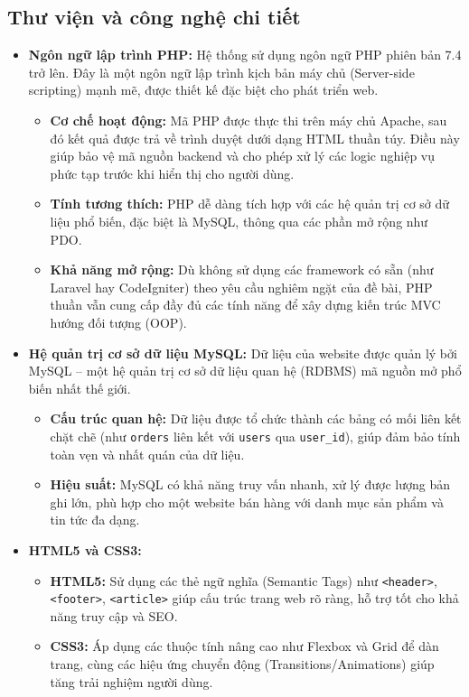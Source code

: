 \subsection{Thư viện và công nghệ chi tiết}
\begin{itemize}
\item \textbf{Ngôn ngữ lập trình PHP: }
Hệ thống sử dụng ngôn ngữ PHP phiên bản 7.4 trở lên. Đây là một ngôn ngữ lập trình kịch bản máy chủ (Server-side scripting) mạnh mẽ, được thiết kế đặc biệt cho phát triển web. 
\begin{itemize}
    \item \textbf{Cơ chế hoạt động:} Mã PHP được thực thi trên máy chủ Apache, sau đó kết quả được trả về trình duyệt dưới dạng HTML thuần túy. Điều này giúp bảo vệ mã nguồn backend và cho phép xử lý các logic nghiệp vụ phức tạp trước khi hiển thị cho người dùng.
    \item \textbf{Tính tương thích:} PHP dễ dàng tích hợp với các hệ quản trị cơ sở dữ liệu phổ biến, đặc biệt là MySQL, thông qua các phần mở rộng như PDO.
    \item \textbf{Khả năng mở rộng:} Dù không sử dụng các framework có sẵn (như Laravel hay CodeIgniter) theo yêu cầu nghiêm ngặt của đề bài, PHP thuần vẫn cung cấp đầy đủ các tính năng để xây dựng kiến trúc MVC hướng đối tượng (OOP).
\end{itemize}
\item \textbf{Hệ quản trị cơ sở dữ liệu MySQL: }
Dữ liệu của website được quản lý bởi MySQL – một hệ quản trị cơ sở dữ liệu quan hệ (RDBMS) mã nguồn mở phổ biến nhất thế giới.
\begin{itemize}
    \item \textbf{Cấu trúc quan hệ:} Dữ liệu được tổ chức thành các bảng có mối liên kết chặt chẽ (như \texttt{orders} liên kết với \texttt{users} qua \texttt{user\_id}), giúp đảm bảo tính toàn vẹn và nhất quán của dữ liệu.
    \item \textbf{Hiệu suất:} MySQL có khả năng truy vấn nhanh, xử lý được lượng bản ghi lớn, phù hợp cho một website bán hàng với danh mục sản phẩm và tin tức đa dạng.
\end{itemize}
\item \textbf{HTML5 và CSS3:}
\begin{itemize}
    \item \textbf{HTML5:} Sử dụng các thẻ ngữ nghĩa (Semantic Tags) như \texttt{<header>}, \texttt{<footer>}, \texttt{<article>} giúp cấu trúc trang web rõ ràng, hỗ trợ tốt cho khả năng truy cập và SEO.
    \item \textbf{CSS3:} Áp dụng các thuộc tính nâng cao như Flexbox và Grid để dàn trang, cùng các hiệu ứng chuyển động (Transitions/Animations) giúp tăng trải nghiệm người dùng.

\end{itemize}
\end{itemize}
